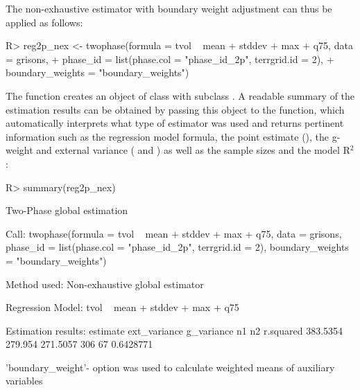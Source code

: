 The non-exhaustive estimator with boundary weight adjustment can thus be applied as follows:

\begin{small}
\begin{Schunk}
\begin{Sinput}
R> reg2p_nex <- twophase(formula = tvol ~ mean + stddev + max + q75, data = grisons, 
+    phase_id = list(phase.col = "phase_id_2p", terrgrid.id = 2),
+    boundary_weights = "boundary_weights")
\end{Sinput}
\end{Schunk}
\end{small}

The  function creates an  object of class  with subclass . A readable summary of the estimation results can be obtained by passing this object to the  function, which automatically interprets what type of estimator was used and returns pertinent information such as the regression model formula, the point estimate (), the g-weight and external variance ( and ) as well as the sample sizes and the model R$^2$:

\begin{small}
\begin{Schunk}
\begin{Sinput}
R> summary(reg2p_nex)
\end{Sinput}
\begin{Soutput}
Two-Phase global estimation
 
Call: 
twophase(formula = tvol ~ mean + stddev + max + q75, data = grisons, 
    phase_id = list(phase.col = "phase_id_2p", terrgrid.id = 2), 
    boundary_weights = "boundary_weights")

Method used:
Non-exhaustive global estimator
 
Regression Model:
tvol ~ mean + stddev + max + q75

Estimation results:
 estimate ext_variance g_variance  n1 n2 r.squared
 383.5354      279.954   271.5057 306 67 0.6428771

'boundary_weight'- option was used to calculate weighted means of auxiliary variables
\end{Soutput}
\end{Schunk}
\end{small}

%  
% 
%  
% 
% 

